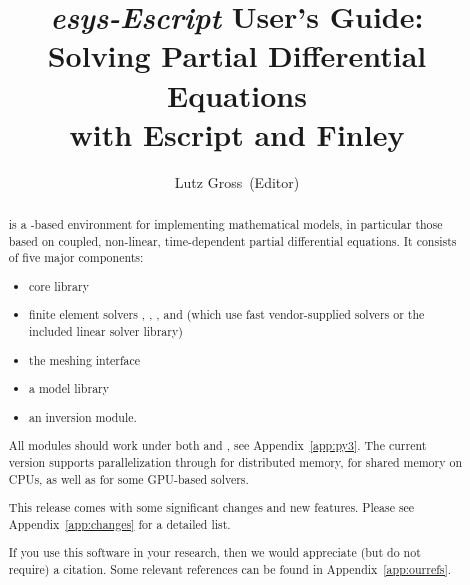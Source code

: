 \documentclass{esysdoc}
\title{\emph{esys-Escript} User's Guide:\\ Solving Partial Differential Equations\\ with Escript and Finley}
\author{Lutz Gross\etal~(Editor)}
\date{\reldate}
\begin{document}
\maketitle

\ifpdf
{}
\fi





\begin{abstract}%
\escript is a \PYTHON-based environment for implementing mathematical models, in particular those based on coupled, non-linear, time-dependent partial differential equations.
It consists of five major components:
\begin{itemize}
\item \escript core library
\item finite element solvers \finley, \dudley, \ripley, and \speckley (which
    use fast vendor-supplied solvers or the included \PASO linear solver library)
\item the meshing interface \pycad
\item a model library
\item an inversion module.
\end{itemize}

All \escript modules should work under both  and , see
Appendix~\ref{app:py3}.
The current version supports parallelization through \MPI for distributed
memory, \OPENMP for shared memory on CPUs, as well as \CUDA for some GPU-based
solvers.

This release comes with some significant changes and new features.
Please see Appendix~\ref{app:changes} for a detailed list.

If you use this software in your research, then we would appreciate (but do not
require) a citation.
Some relevant references can be found in Appendix~\ref{app:ourrefs}.
\end{abstract}


\cleardoublepage{}%
\tableofcontents












%

\esysappendix %

%


\cleardoublepage
{}
{}
\printindex

\cleardoublepage
{}
{}


\end{document}

